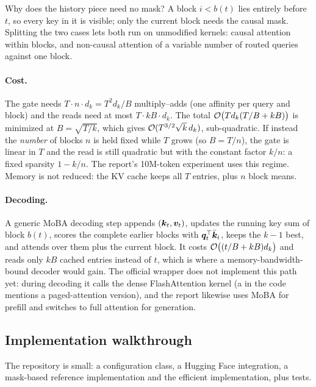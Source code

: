 Why does the history piece need no mask? A block $i<b(t)$ lies entirely before $t$, so every key
in it is visible; only the current block needs the causal mask. Splitting the two cases lets
both run on unmodified kernels: causal attention within blocks, and non-causal attention of a
variable number of routed queries against one block.

\paragraph{Cost.}
The gate needs $T\cdot n\cdot d_k=T^2d_k/B$ multiply--adds (one affinity per query and block) and
the reads need at most $T\cdot kB\cdot d_k$. The total
$\mathcal{O}\big(Td_k(T/B+kB)\big)$ is minimized at $B=\sqrt{T/k}$, which gives
$\mathcal{O}(T^{3/2}\sqrt{k}\,d_k)$, sub-quadratic. If instead the \emph{number} of blocks $n$ is held
fixed while $T$ grows (so $B=T/n$), the gate is linear in $T$ and the read is still quadratic but
with the constant factor $k/n$: a fixed sparsity $1-k/n$. The report's 10M-token experiment uses
this regime. Memory is not reduced: the KV cache keeps all $T$ entries, plus $n$ block means.

\paragraph{Decoding.} A generic MoBA decoding step appends $(\bm{k}_t,\bm{v}_t)$, updates the running
key sum of block $b(t)$, scores the complete earlier blocks with $\bm{q}_t^{\top}\bar{\bm{k}}_i$, keeps the
$k-1$ best, and attends over them plus the current block. It costs $\mathcal{O}\big((t/B+kB)d_k\big)$ and reads only $kB$ cached entries instead of
$t$, which is where a memory-bandwidth-bound decoder would gain. The official wrapper does not
implement this path yet: during decoding it calls the dense FlashAttention kernel (a
 in the code mentions a paged-attention version), and the report likewise uses MoBA
for prefill and switches to full attention for generation.

\subsection{Implementation walkthrough}

The repository  is small: a configuration class, a Hugging Face
integration, a mask-based reference implementation and the efficient implementation, plus tests.

